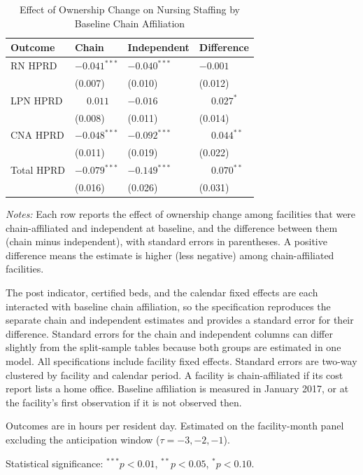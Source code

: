 \documentclass[11pt]{article}
\begin{document}
\begin{table}[!ht]
\centering
\begin{threeparttable}
\caption{Effect of Ownership Change on Nursing Staffing by Baseline Chain Affiliation}
\label{tab:chain-interaction}
\small
\setlength{\tabcolsep}{6pt}

\begin{tabularx}{\textwidth}{@{} l Y Y Y @{}}
\toprule
Outcome & Chain & Independent & Difference \\
\midrule
RN HPRD & $-0.041^{***}$ & $-0.040^{***}$ & $-0.001$ \\
 & (0.007) & (0.010) & (0.012) \\[3pt]
LPN HPRD & $\phantom{-}0.011$ & $-0.016$ & $\phantom{-}0.027^{*}$ \\
 & (0.008) & (0.011) & (0.014) \\[3pt]
CNA HPRD & $-0.048^{***}$ & $-0.092^{***}$ & $\phantom{-}0.044^{**}$ \\
 & (0.011) & (0.019) & (0.022) \\[3pt]
Total HPRD & $-0.079^{***}$ & $-0.149^{***}$ & $\phantom{-}0.070^{**}$ \\
 & (0.016) & (0.026) & (0.031) \\[3pt]
\bottomrule
\end{tabularx}

\begin{tablenotes}[flushleft]
\footnotesize
\item \textit{Notes:} Each row reports the effect of ownership change among facilities that were chain-affiliated and independent at baseline, and the difference between them (chain minus independent), with standard errors in parentheses. A positive difference means the estimate is higher (less negative) among chain-affiliated facilities.
\item The post indicator, certified beds, and the calendar fixed effects are each interacted with baseline chain affiliation, so the specification reproduces the separate chain and independent estimates and provides a standard error for their difference. Standard errors for the chain and independent columns can differ slightly from the split-sample tables because both groups are estimated in one model. All specifications include facility fixed effects. Standard errors are two-way clustered by facility and calendar period. A facility is chain-affiliated if its cost report lists a home office. Baseline affiliation is measured in January 2017, or at the facility's first observation if it is not observed then.
\item Outcomes are in hours per resident day. Estimated on the facility-month panel excluding the anticipation window ($\tau = -3, -2, -1$).
\item Statistical significance: $^{***}p<0.01$, $^{**}p<0.05$, $^{*}p<0.10$.
\end{tablenotes}

\end{threeparttable}
\end{table}
\end{document}
